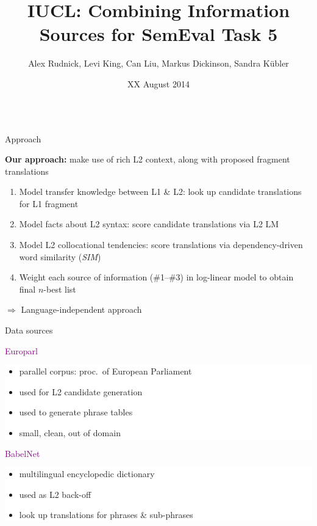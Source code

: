 \documentclass[final,t]{beamer}
\title[]{IUCL: Combining Information Sources for SemEval Task 5}
\author[]{Alex Rudnick, Levi King, Can Liu, Markus Dickinson, Sandra K\"ubler}
\institute[]{Indiana University}
\date[]{XX August 2014}
\begin{document}
\begin{frame}{}
  \begin{columns}[t]
    \begin{column}{.4\linewidth}

\begin{block}{Approach}

  \textbf{Our approach:} make use of rich L2 context, along with
  proposed fragment translations

  \medskip

  \begin{enumerate}
  \item Model transfer knowledge between L1 \& L2: look up candidate
    translations for L1 fragment
  \item Model facts about L2 syntax: score candidate translations via
    L2 LM
  \item Model L2 collocational tendencies: score translations via
    dependency-driven word similarity (\textit{SIM})
  \item Weight each source of information (\#1--\#3) in log-linear
    model to obtain final $n$-best list
  \end{enumerate}

  $\Rightarrow$ Language-independent approach

\end{block}

\begin{block}{Data sources}

\begin{center}
\textcolor{purple}{Europarl}
\end{center}

\colorbox{white}{
\begin{minipage}{.85\linewidth}
\begin{itemize}
\item parallel corpus: proc.\ of European Parliament
\item used for L2 candidate generation
\item  used to generate phrase tables
\item small, clean, out of domain
\end{itemize}
\end{minipage}
}

\begin{center}
\textcolor{purple}{BabelNet}
\end{center}

\colorbox{white}{
\begin{minipage}{.85\linewidth}
\begin{itemize}
\item multilingual encyclopedic dictionary
\item used as L2 back-off 
\item look up translations for phrases \& sub-phrases
\end{itemize}
\end{minipage}
}


\end{block}
\end{column}
\end{columns}
\end{frame}
\end{document}
